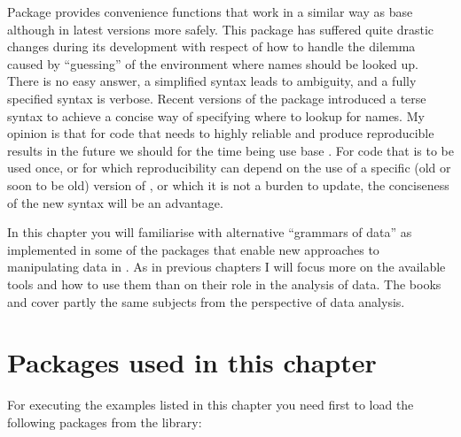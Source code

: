 \documentclass[krantz2]{krantz}\usepackage{knitr}%
\begin{document}
Package  provides convenience functions that work in a similar way as base \Rlang {} although in latest versions more safely. This package has suffered quite drastic changes during its development with respect of how to handle the dilemma caused by ``guessing'' of the environment where names should be looked up. There is no easy answer, a simplified syntax leads to ambiguity, and a fully specified syntax is verbose. Recent versions of the package introduced a terse syntax to achieve a concise way of specifying where to lookup for names. My opinion is that for code that needs to highly reliable and produce reproducible results in the future we should for the time being use base \Rlang. For code that is to be used once, or for which reproducibility can depend on the use of a specific (old or soon to be old) version of , or which it is not a burden to update, the conciseness of the new syntax will be an advantage.

In this chapter you will familiarise with alternative ``grammars of data'' as implemented in some of the packages that enable new approaches to manipulating data in \Rlang. As in previous chapters I will focus more on the available tools and how to use them than on their role in the analysis of data. The books  \autocite{Wickham2017} and  \autocite{Peng2016} cover partly the same subjects from the perspective of data analysis.

\section{Packages used in this chapter}

\begin{knitrout}\footnotesize
{}\color{fgcolor}\begin{kframe}
\begin{alltt}
\hlopt{::}
\end{alltt}
\end{kframe}
\end{knitrout}

For executing the examples listed in this chapter you need first to load the following packages from the library:

\begin{knitrout}\footnotesize
{}\color{fgcolor}\begin{kframe}
\begin{alltt}
\end{alltt}
\end{kframe}
\end{knitrout}
\end{document}

